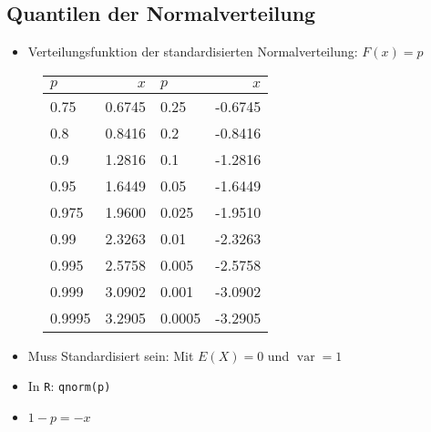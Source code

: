 \subsection{Quantilen der Normalverteilung}
\begin{itemize}
  \item Verteilungsfunktion der standardisierten Normalverteilung: $F(x) = p$
\end{itemize}
\begin{figure}[!h]
  \begin{center}
    \scriptsize
    \begin{tabular}{|l|r||l|r|}
      \hline
      $p$&$x$ & $p$ & $x$ \\
      \hline
      0.75&0.6745 & 0.25 & -0.6745 \\
      0.8&0.8416 & 0.2 & -0.8416 \\
      0.9&1.2816 & 0.1 & -1.2816 \\
      0.95&1.6449 & 0.05 & -1.6449 \\
      0.975&1.9600 & 0.025 & -1.9510 \\
      0.99&2.3263 & 0.01 & -2.3263 \\
      0.995&2.5758 & 0.005 & -2.5758 \\
      0.999&3.0902 & 0.001 & -3.0902 \\
      0.9995&3.2905 & 0.0005 & -3.2905 \\
      \hline
    \end{tabular}
  \end{center}
\end{figure}
\begin{itemize}
  \item Muss Standardisiert sein: Mit $E(X) = 0$ und
    $\operatorname{var} = 1$
  \item In \texttt{R}: \texttt{qnorm(p)}
  \item $1-p = -x$
\end{itemize}

\pagebreak
